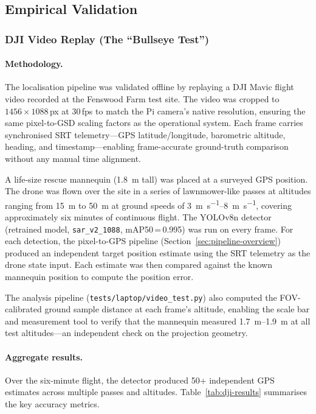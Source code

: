 \subsection{Empirical Validation}\label{sec:validation}

\subsubsection{DJI Video Replay (The ``Bullseye Test'')}\label{sec:dji-validation}

\paragraph{Methodology.}
The localisation pipeline was validated offline by replaying a DJI Mavic flight video recorded at the Fenswood Farm test site.  The video was cropped to $1456 \times 1088$\,px at 30\,fps to match the Pi camera's native resolution, ensuring the same pixel-to-GSD scaling factors as the operational system.  Each frame carries synchronised SRT telemetry---GPS latitude/longitude, barometric altitude, heading, and timestamp---enabling frame-accurate ground-truth comparison without any manual time alignment.

A life-size rescue mannequin (\SI{1.8}{\metre} tall) was placed at a surveyed GPS position.  The drone was flown over the site in a series of lawnmower-like passes at altitudes ranging from \SI{15}{\metre} to \SI{50}{\metre} at ground speeds of \SIrange{3}{8}{\metre\per\second}, covering approximately six minutes of continuous flight.  The YOLOv8n detector (retrained model, \texttt{sar\_v2\_1088}, mAP50\,=\,0.995) was run on every frame.  For each detection, the pixel-to-GPS pipeline (Section~\ref{sec:pipeline-overview}) produced an independent target position estimate using the SRT telemetry as the drone state input.  Each estimate was then compared against the known mannequin position to compute the position error.

The analysis pipeline (\texttt{tests/laptop/video\_test.py}) also computed the FOV-calibrated ground sample distance at each frame's altitude, enabling the scale bar and measurement tool to verify that the mannequin measured \SIrange{1.7}{1.9}{\metre} at all test altitudes---an independent check on the projection geometry.

\paragraph{Aggregate results.}
Over the six-minute flight, the detector produced 50+ independent GPS estimates across multiple passes and altitudes.  Table~\ref{tab:dji-results} summarises the key accuracy metrics.

